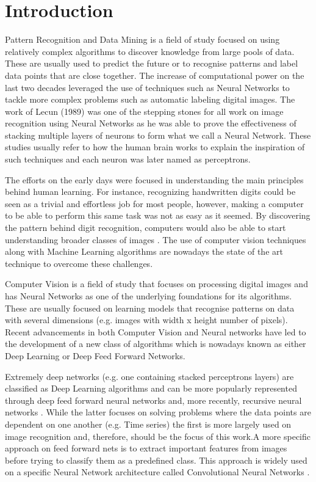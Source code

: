 \chapter{Introduction}
Pattern Recognition and Data Mining is a field of study focused on using relatively complex algorithms to discover knowledge from large pools of data. These are usually used to predict the future or to recognise patterns and label data points that are close together. The increase of computational power on the last two decades leveraged the use of techniques such as Neural Networks \cite{bishop1995neural} to tackle more complex problems such as automatic labeling digital images. The work of Lecun (1989) \cite{lecunn89} was one of the stepping stones for all work on image recognition using Neural Networks as he was able to prove the effectiveness of stacking multiple layers of neurons to form what we call a Neural Network. These studies usually refer to how the human brain works to explain the inspiration of such techniques and each neuron was later named as perceptrons.

The efforts on the early days were focused in understanding the main principles behind human learning. For instance, recognizing handwritten digits could be seen as a trivial and effortless job for most people, however, making a computer to be able to perform this same task was not as easy as it seemed. By discovering the pattern behind digit recognition, computers would also be able to start understanding broader classes of images \cite{krizhevsky2012}. The use of computer vision techniques along with Machine Learning algorithms are nowadays the state of the art technique to overcome these challenges.

Computer Vision is a field of study that focuses on processing digital images and has Neural Networks as one of the underlying foundations for its algorithms. These are usually  focused on learning models that recognise patterns on data with several dimensions (e.g. images with width x height number of pixels). Recent advancements in both Computer Vision and Neural networks have led to the development of a new class of algorithms which is nowadays known as either Deep Learning or Deep Feed Forward Networks.

Extremely deep networks (e.g. one containing stacked perceptrons layers) are classified as Deep Learning algorithms and can be more popularly represented through deep feed forward neural networks \cite{hornik1989multilayer} and, more recently, recursive neural networks \cite{goller1996learning}. While the latter focuses on solving problems where the data points are dependent on one another (e.g. Time series) the first is more largely used on image recognition and, therefore, should be the focus of this work.A more specific approach on feed forward nets is to extract important features from images before trying to classify them as a predefined class. This approach is widely used on a specific Neural Network architecture called Convolutional Neural Networks \cite{matsugu2003subject}.

